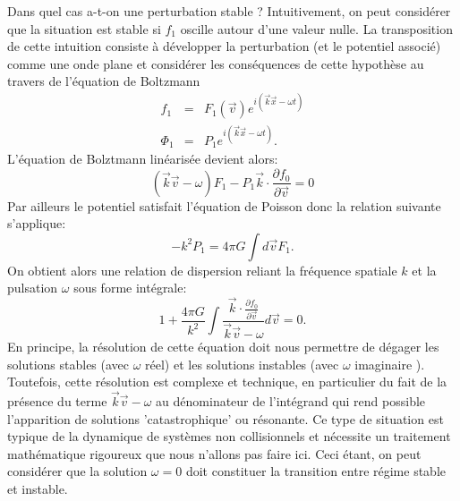 Dans quel cas a-t-on une perturbation stable ? Intuitivement, on peut considérer que la situation est stable si $f_1$ oscille autour d'une valeur nulle. La transposition de cette intuition consiste à développer la perturbation (et le potentiel associé) comme une onde plane et considérer les conséquences de cette hypothèse au travers de l'équation de Boltzmann
\begin{eqnarray}
f_1&=&F_1(\vec{v})e^{i(\vec{k}\vec{x}-\omega t)}\\
\Phi_1&=&P_1e^{i(\vec{k}\vec{x}-\omega t)}.
\end{eqnarray}
L'équation de Bolztmann linéarisée devient alors:
\begin{equation}
(\vec{k}\vec{v}-\omega )F_1-P_1\vec{k}\cdot\frac{\partial f_0}{\partial \vec{v}}=0
\end{equation}
Par ailleurs le potentiel satisfait l'équation de Poisson donc la relation suivante s'applique:
\begin{equation}
-k^2 P_1=4\pi G \int d\vec{v} F_1.
\end{equation}
On obtient alors une relation de dispersion reliant la fréquence spatiale $k$ et la pulsation $\omega$ sous forme intégrale:
\begin{equation}
1+\frac{4\pi G}{k^2}\int \frac{\vec{k}\cdot\frac{\partial f_0}{\partial \vec{v}}}{\vec{k}\vec{v}-\omega}d\vec{v}=0.
\end{equation}
En principe, la résolution de cette équation doit nous permettre de dégager les solutions stables (avec $\omega$ réel) et les solutions instables (avec $\omega$ imaginaire ). Toutefois, cette résolution est complexe et technique, en particulier du fait de la présence du terme $\vec{k}\vec{v}-\omega$ au dénominateur de l'intégrand qui rend possible l'apparition de solutions 'catastrophique' ou résonante. Ce type de situation est typique de la dynamique de systèmes non collisionnels et nécessite un traitement mathématique rigoureux que nous n'allons pas faire ici. Ceci étant, on peut considérer que la solution $\omega=0$ doit constituer la transition entre régime stable et instable.

